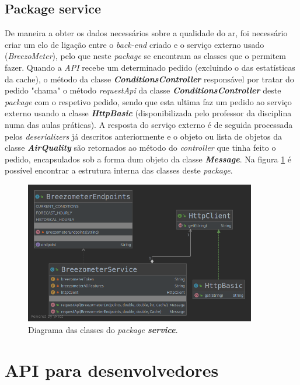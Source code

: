 \subsection{Package service}
De maneira a obter os dados necessários sobre a qualidade do ar, foi necessário criar um elo de ligação entre o \textit{back-end} criado e o serviço externo usado (\textit{BreezoMeter}), pelo que neste \textit{package} se encontram as classes que o permitem fazer. Quando a \textit{API} recebe um determinado pedido (excluindo o das estatísticas da cache), o método da classe \textbf{\textit{ConditionsController}} responsável por tratar do pedido "chama" o método \textit{requestApi} da classe \textbf{\textit{ConditionsController}} deste \textit{package} com o respetivo pedido, sendo que esta ultima faz um pedido ao serviço externo usando a classe \textbf{\textit{HttpBasic}} (disponibilizada pelo professor da disciplina numa das aulas práticas). A resposta do serviço externo é de seguida processada pelos \textit{deserializers} já descritos anteriormente e o objeto ou lista de objetos da classe \textbf{\textit{AirQuality}} são retornados ao método do \textit{controller} que tinha feito o pedido, encapsulados sob a forma dum objeto da classe \textbf{\textit{Message}}. Na figura \ref{fig:service_diagram} é possível encontrar a estrutura interna das classes deste \textit{package}.

\begin{figure}[h]
   \centering
   \includegraphics[width=0.90\textwidth]{images/service_diagram}
   \caption{Diagrama das classes do \textit{package \textbf{service}}.}
   \label{fig:service_diagram}
\end{figure}


\section{API para desenvolvedores}

